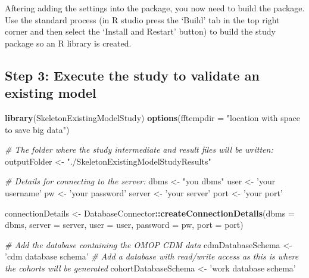 \documentclass[
]{article}
\newenvironment{Shaded}{\begin{snugshade}}{\end{snugshade}}
\newcommand{\CommentTok}[1]{\textcolor[rgb]{0.56,0.35,0.01}{\textit{#1}}}
\newcommand{\DataTypeTok}[1]{\textcolor[rgb]{0.13,0.29,0.53}{#1}}
\newcommand{\KeywordTok}[1]{\textcolor[rgb]{0.13,0.29,0.53}{\textbf{#1}}}
\newcommand{\NormalTok}[1]{#1}
\newcommand{\OperatorTok}[1]{\textcolor[rgb]{0.81,0.36,0.00}{\textbf{#1}}}
\newcommand{\StringTok}[1]{\textcolor[rgb]{0.31,0.60,0.02}{#1}}
\begin{document}
Aftering adding the settings into the package, you now need to build the
package. Use the standard process (in R studio press the `Build' tab in
the top right corner and then select the `Install and Restart' button)
to build the study package so an R library is created.

\hypertarget{step-3-execute-the-study-to-validate-an-existing-model}{%
\subsection{Step 3: Execute the study to validate an existing
model}\label{step-3-execute-the-study-to-validate-an-existing-model}}

\begin{Shaded}
\begin{Highlighting}[]
  \KeywordTok{library}\NormalTok{(SkeletonExistingModelStudy)}
  \KeywordTok{options}\NormalTok{(}\DataTypeTok{fftempdir =} \StringTok{"location with space to save big data"}\NormalTok{)}
  
  \CommentTok{# The folder where the study intermediate and result files will be written:}
\NormalTok{  outputFolder <-}\StringTok{ "./SkeletonExistingModelStudyResults"}
  
  \CommentTok{# Details for connecting to the server:}
\NormalTok{  dbms <-}\StringTok{ "you dbms"}
\NormalTok{  user <-}\StringTok{ 'your username'}
\NormalTok{  pw <-}\StringTok{ 'your password'}
\NormalTok{  server <-}\StringTok{ 'your server'}
\NormalTok{  port <-}\StringTok{ 'your port'}
  
\NormalTok{  connectionDetails <-}\StringTok{ }\NormalTok{DatabaseConnector}\OperatorTok{::}\KeywordTok{createConnectionDetails}\NormalTok{(}\DataTypeTok{dbms =}\NormalTok{ dbms,}
                                                                  \DataTypeTok{server =}\NormalTok{ server,}
                                                                  \DataTypeTok{user =}\NormalTok{ user,}
                                                                  \DataTypeTok{password =}\NormalTok{ pw,}
                                                                  \DataTypeTok{port =}\NormalTok{ port)}
  
  \CommentTok{# Add the database containing the OMOP CDM data}
\NormalTok{  cdmDatabaseSchema <-}\StringTok{ 'cdm database schema'}
  \CommentTok{# Add a database with read/write access as this is where the cohorts will be generated}
\NormalTok{  cohortDatabaseSchema <-}\StringTok{ 'work database schema'}
  

\end{Highlighting}
\end{Shaded}
\end{document}

